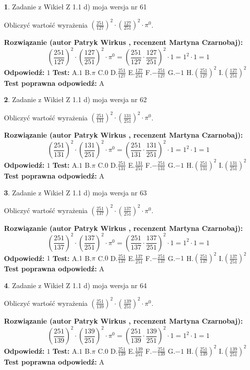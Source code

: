 \documentclass[12pt, a4paper]{article}
\theoremstyle{definition} %
\newtheorem{zad}{}
\newcommand{\zadStart}[1]{\begin{zad}#1\newline}
\newcommand{\zadStop}{\end{zad}}
\newcommand{\rozwStart}[2]{\noindent \textbf{Rozwiązanie (autor #1 , recenzent #2): }\newline}
\newcommand{\rozwStop}{\newline}
\newcommand{\odpStart}{\noindent \textbf{Odpowiedź:}\newline}
\newcommand{\odpStop}{\newline}
\newcommand{\testStart}{\noindent \textbf{Test:}\newline}
\newcommand{\testStop}{\newline}
\newcommand{\kluczStart}{\noindent \textbf{Test poprawna odpowiedź:}\newline}
\newcommand{\kluczStop}{\newline}
\begin{document}
\zadStart{Zadanie z Wikieł Z 1.1 d) moja wersja nr 61}

Obliczyć wartość wyrażenia $(\frac{251}{127})^{2} \cdot (\frac{127}{251})^{2} \cdot \pi^{0}$.
\zadStop
\rozwStart{Patryk Wirkus}{Martyna Czarnobaj}
$$(\frac{251}{127})^{2} \cdot (\frac{127}{251})^{2} \cdot \pi^{0} = (\frac{251}{127} \cdot \frac{127}{251})^{2} \cdot 1 = 1^{2} \cdot 1 = 1$$
\rozwStop
\odpStart
$1$
\odpStop
\testStart
A.$1$ B.$\pi$ C.$0$ D.$\frac{251}{127}$ E.$\frac{127}{251}$
F.$-\frac{251}{127}$ G.$-1$
H.$(\frac{251}{127})^{2}$
I.$(\frac{127}{251})^{2}$
\testStop
\kluczStart
A
\kluczStop



\zadStart{Zadanie z Wikieł Z 1.1 d) moja wersja nr 62}

Obliczyć wartość wyrażenia $(\frac{251}{131})^{2} \cdot (\frac{131}{251})^{2} \cdot \pi^{0}$.
\zadStop
\rozwStart{Patryk Wirkus}{Martyna Czarnobaj}
$$(\frac{251}{131})^{2} \cdot (\frac{131}{251})^{2} \cdot \pi^{0} = (\frac{251}{131} \cdot \frac{131}{251})^{2} \cdot 1 = 1^{2} \cdot 1 = 1$$
\rozwStop
\odpStart
$1$
\odpStop
\testStart
A.$1$ B.$\pi$ C.$0$ D.$\frac{251}{131}$ E.$\frac{131}{251}$
F.$-\frac{251}{131}$ G.$-1$
H.$(\frac{251}{131})^{2}$
I.$(\frac{131}{251})^{2}$
\testStop
\kluczStart
A
\kluczStop



\zadStart{Zadanie z Wikieł Z 1.1 d) moja wersja nr 63}

Obliczyć wartość wyrażenia $(\frac{251}{137})^{2} \cdot (\frac{137}{251})^{2} \cdot \pi^{0}$.
\zadStop
\rozwStart{Patryk Wirkus}{Martyna Czarnobaj}
$$(\frac{251}{137})^{2} \cdot (\frac{137}{251})^{2} \cdot \pi^{0} = (\frac{251}{137} \cdot \frac{137}{251})^{2} \cdot 1 = 1^{2} \cdot 1 = 1$$
\rozwStop
\odpStart
$1$
\odpStop
\testStart
A.$1$ B.$\pi$ C.$0$ D.$\frac{251}{137}$ E.$\frac{137}{251}$
F.$-\frac{251}{137}$ G.$-1$
H.$(\frac{251}{137})^{2}$
I.$(\frac{137}{251})^{2}$
\testStop
\kluczStart
A
\kluczStop



\zadStart{Zadanie z Wikieł Z 1.1 d) moja wersja nr 64}

Obliczyć wartość wyrażenia $(\frac{251}{139})^{2} \cdot (\frac{139}{251})^{2} \cdot \pi^{0}$.
\zadStop
\rozwStart{Patryk Wirkus}{Martyna Czarnobaj}
$$(\frac{251}{139})^{2} \cdot (\frac{139}{251})^{2} \cdot \pi^{0} = (\frac{251}{139} \cdot \frac{139}{251})^{2} \cdot 1 = 1^{2} \cdot 1 = 1$$
\rozwStop
\odpStart
$1$
\odpStop
\testStart
A.$1$ B.$\pi$ C.$0$ D.$\frac{251}{139}$ E.$\frac{139}{251}$
F.$-\frac{251}{139}$ G.$-1$
H.$(\frac{251}{139})^{2}$
I.$(\frac{139}{251})^{2}$
\testStop
\kluczStart
A
\kluczStop
\end{document}
